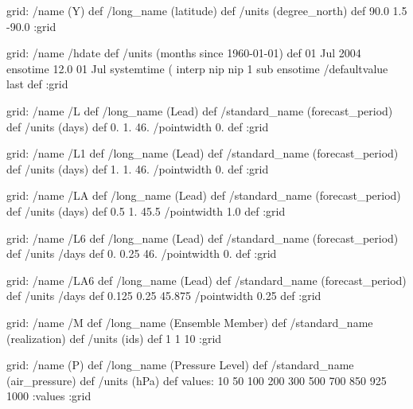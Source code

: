 \begin{ingrid}
{grid:
/name (Y) def
/long_name (latitude) def
/units (degree_north) def
90.0 1.5 -90.0
:grid

grid:
/name /hdate def
/units (months since 1960-01-01) def
01 Jul 2004 ensotime
12.0
01 Jul 
systemtime
   (%
    interp nip nip
    1 sub
ensotime
/defaultvalue { last } def
:grid

grid:
/name /L def
/long_name (Lead) def
/standard_name (forecast_period) def
/units (days) def
0. 1. 46.
/pointwidth 0. def
:grid

grid:
/name /L1 def
/long_name (Lead) def
/standard_name (forecast_period) def
/units (days) def
1. 1. 46.
/pointwidth 0. def
:grid

grid:
/name /LA def
/long_name (Lead) def
/standard_name (forecast_period) def
/units (days) def
0.5 1. 45.5
/pointwidth 1.0 def
:grid

 grid:
 /name /L6 def
 /long_name (Lead) def
 /standard_name (forecast_period) def
 /units /days def
 0. 0.25 46.
 /pointwidth 0. def
 :grid
 
 grid:
 /name /LA6 def
 /long_name (Lead) def
 /standard_name (forecast_period) def
 /units /days def
 0.125 0.25 45.875
 /pointwidth 0.25 def
 :grid

grid:
/name /M def
/long_name (Ensemble Member) def
/standard_name (realization) def
/units (ids) def
1 1 10
:grid

grid:
/name (P) def
/long_name (Pressure Level) def
/standard_name (air_pressure) def
/units (hPa) def
values: 10 50 100 200 300 500 700 850 925 1000 :values
:grid

}
\end{ingrid}
